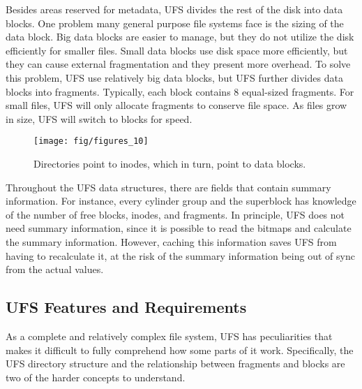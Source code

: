 Besides areas reserved for metadata, UFS divides the rest of the disk into
data blocks. One problem many general purpose file systems face is the sizing
of the data block. Big data blocks are easier to manage, but they do not
utilize the disk efficiently for smaller files. Small data blocks use disk
space more efficiently, but they can cause external fragmentation and they
present more overhead. To solve this problem, UFS use relatively big data
blocks, but UFS further divides data blocks into fragments. Typically, each
block contains 8 equal-sized fragments. For small files, UFS will only
allocate fragments to conserve file space. As files grow in size, UFS will
switch to blocks for speed.

\begin{figure}[htb]
  \centering
  \texttt{[image: fig/figures\_10]}
  \caption{\label{fig:ufs_data} Directories point to inodes, which in turn,
	  point to data blocks.}
\end{figure}

Throughout the UFS data structures, there are fields that contain summary
information. For instance, every cylinder group and the superblock has
knowledge of the number of free blocks, inodes, and fragments. In principle,
UFS does not need summary information, since it is possible to read the bitmaps
and calculate the summary information. However, caching this information saves
UFS from having to recalculate it, at the risk of the summary information
being out of sync from the actual values.


\subsection{UFS Features and Requirements}
\label{sec:ufs:features}

As a complete and relatively complex file system, UFS has peculiarities that
makes it difficult to fully comprehend how some parts of it work. Specifically,
the UFS directory structure and the relationship between fragments and blocks
are two of the harder concepts to understand.

